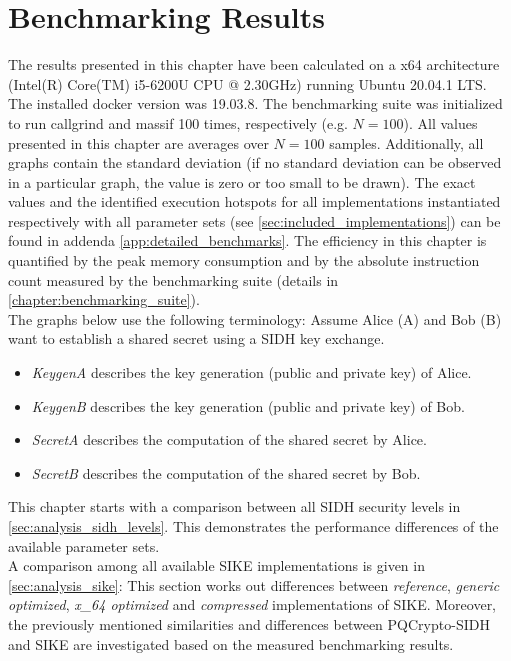 \chapter{Benchmarking Results}\label{chapter:analysis}

The results presented in this chapter have been calculated on a x64 architecture (Intel(R) Core(TM) i5-6200U CPU @ 2.30GHz) running Ubuntu 20.04.1 LTS. The installed docker version was 19.03.8. The benchmarking suite was initialized to run callgrind and massif 100 times, respectively (e.g. $N=100$). All values presented in this chapter are averages over $N=100$ samples. Additionally, all graphs contain the standard deviation (if no standard deviation can be observed in a particular graph, the value is zero or too small to be drawn). The exact values and the identified execution hotspots for all implementations instantiated respectively with all parameter sets (see \autoref{sec:included_implementations}) can be found in addenda \ref{app:detailed_benchmarks}. The efficiency in this chapter is quantified by the peak memory consumption and by the absolute instruction count measured by the benchmarking suite (details in \autoref{chapter:benchmarking_suite}). \\
The graphs below use the following terminology:
Assume Alice (A) and Bob (B) want to establish a shared secret using a \gls{SIDH} key exchange.
\begin{itemize}
\item \textit{KeygenA} describes the key generation (public and private key) of Alice.
\item \textit{KeygenB} describes the key generation (public and private key) of Bob.
\item \textit{SecretA} describes the computation of the shared secret by Alice.
\item \textit{SecretB} describes the computation of the shared secret by Bob.
\end{itemize}
This chapter starts with a comparison between all \gls{SIDH} security levels in \autoref{sec:analysis_sidh_levels}. This demonstrates the performance differences of the available parameter sets. \\
A comparison among all available \gls{SIKE} implementations is given in \autoref{sec:analysis_sike}: This section  works out differences between \textit{reference}, \textit{generic optimized}, \textit{x\_64 optimized} and \textit{compressed} implementations of SIKE. Moreover, the previously mentioned similarities and differences between \gls{PQCrypto-SIDH} and \gls{SIKE} are investigated based on the measured benchmarking results. \\
